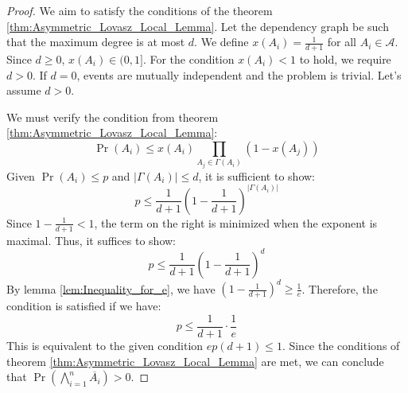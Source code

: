 \begin{proof}
    We aim to satisfy the conditions of the theorem \ref{thm:Asymmetric_Lovasz_Local_Lemma}. Let the dependency graph be such that the maximum degree is at most $d$. We define $x(A_i) = \frac{1}{d+1}$ for all $A_i \in \mathcal{A}$. Since $d \geq 0$, $x(A_i) \in (0, 1]$. For the condition $x(A_i) < 1$ to hold, we require $d>0$. If $d=0$, events are mutually independent and the problem is trivial. Let's assume $d>0$.

    We must verify the condition from theorem \ref{thm:Asymmetric_Lovasz_Local_Lemma}:
    $$ \Pr(A_i) \leq x(A_i) \prod_{A_j \in \Gamma(A_i)} (1-x(A_j)) $$
    Given $\Pr(A_i) \leq p$ and $|\Gamma(A_i)| \leq d$, it is sufficient to show:
    $$ p \leq \frac{1}{d+1} \left(1-\frac{1}{d+1}\right)^{|\Gamma(A_i)|} $$
    Since $1 - \frac{1}{d+1} < 1$, the term on the right is minimized when the exponent is maximal. Thus, it suffices to show:
    $$ p \leq \frac{1}{d+1} \left(1-\frac{1}{d+1}\right)^d $$
    By lemma \ref{lem:Inequality_for_e}, we have $\left(1-\frac{1}{d+1}\right)^d \geq \frac{1}{e}$.
    Therefore, the condition is satisfied if we have:
    $$ p \leq \frac{1}{d+1} \cdot \frac{1}{e} $$
    This is equivalent to the given condition $ep(d+1) \leq 1$.
    Since the conditions of theorem \ref{thm:Asymmetric_Lovasz_Local_Lemma} are met, we can conclude that $\Pr(\bigwedge_{i=1}^n \overline{A_i}) > 0$.
\end{proof}

